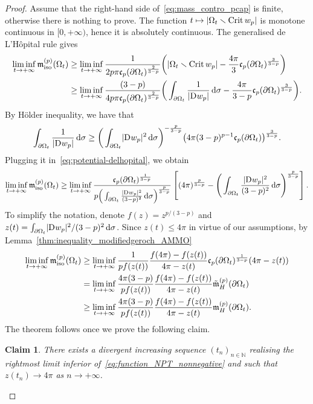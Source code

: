 \documentclass[11pt]{article}
\numberwithin{equation}{section}
\newcommand{\N}{\mathbb{N}}
\newcommand{\dif}{\,\mathrm{d}}
\newcommand{\D}{\mathrm{D}\kern.01cm}
\newcommand{\ncapa}{\mathfrak{c}}
\DeclareMathOperator{\iso}{iso}
\DeclareMathOperator{\Crit}{Crit}
\DeclarePairedDelimiter{\sigmaAbs}{\lvert}{\rvert}
\newcommand{\abs}[1]{\ifstrempty{#1}{\sigmaAbs{\kern1pt\cdot\kern1pt}}{\mathchoice{\sigmaAbs*{#1}}{\sigmaAbs{#1}}{\sigmaAbs{#1}}{\sigmaAbs{#1}}}}
\numberwithin{equation}{section}
\newtheorem{Claim}[Theorem]{Claim}
\renewcommand{\ncapa}{\mathfrak{c}}
\newcommand{\ma}{\mathfrak{m}}
\newcommand{\tp}[1][p]{{\text{\tiny$(#1)$}}}
\begin{document}
\begin{proof} Assume that the right-hand side of~\eqref{eq:mass_contro_pcap} is finite, otherwise there is nothing to prove. The function $t\mapsto \abs{\Omega_t\smallsetminus \Crit w_p}$ is monotone continuous in $[0, +\infty)$, hence it is absolutely continuous. The generalised de L'H\^opital rule gives
\begin{align}
 \liminf_{t \to +\infty} \ma_{\iso}^{\tp}(\Omega_t)&{}\geq\liminf_{t \to +\infty} \frac{1}{2p\pi \ncapa_p(\partial \Omega_t)^{\frac{2}{3-p}}}\bigg( \abs{\Omega_t\smallsetminus \Crit w_p } -\frac{4 \pi}{3} \ncapa_p (\partial \Omega_t)^\frac{3}{3-p}\bigg)\nonumber\\
 &{}\geq \liminf_{t \to +\infty} \frac{(3-p)}{4 p\pi \ncapa_p(\partial \Omega_t)^{\frac{2}{3-p}}}\bigg(\int_{\partial \Omega_t} \frac{1}{\abs{\D w_p}} \dif \sigma-\frac{4 \pi}{3-p} \ncapa_p (\partial \Omega_t)^\frac{3}{3-p}\bigg).\label{eq:potential-delhopital}
\end{align}
By H\"{o}lder inequality, we have that
\[
 \int_{\partial \Omega_t }\frac{1}{\abs{\D w_p}} \dif \sigma \geq \bigg(\int_{\partial \Omega_t}\abs{\D w_p}^2 \dif \sigma\bigg)^{-\frac{p}{3-p}}\big( 4 \pi (3-p)^{p-1}\ncapa_p(\partial \Omega_t)\big)^{\frac{3}{3-p}}.
\]
Plugging it in~\eqref{eq:potential-delhopital}, we obtain
\[
 \liminf_{t \to +\infty} \ma_{\iso}^{\tp}(\Omega_t)\geq\liminf_{t \to +\infty} \frac{\ncapa_p(\partial \Omega_t)^{\frac{1}{3-p}}}{p\Big(\int_{\partial \Omega_t} \frac{\abs{ \D w_p}^2}{(3-p)^2} \dif \sigma\Big)^{\frac{p}{3-p}} }\left[ ( 4\pi)^{\frac{p}{3-p}}-\Bigg(\int_{\partial \Omega_t}\frac{\abs{ \D w_p}^2}{(3-p)^2} \dif \sigma \Bigg)^{\frac{p}{3-p}}\right].
\]
To simplify the notation, denote $f(z)=z^{p/(3-p)}$ and $z(t)=\int_{\partial \Omega_t} \abs{\D w_p}^2 /(3-p)^2 \dif \sigma$. Since $z(t)\leq 4 \pi$ in virtue of our assumptions, by Lemma~\ref{thm:inequality_modifiedgeroch_AMMO}
\begin{align}
 \liminf_{t \to +\infty} \ma_{\iso}^{\tp}(\Omega_t)&{}\geq \liminf_{t \to +\infty}\frac{1}{p f(z(t))} \frac{f(4 \pi )-f(z(t))}{4\pi-z(t)} \ncapa_p(\partial \Omega_t)^{\frac{1}{3-p}}( 4 \pi -z(t)) \nonumber\\
 &{}=\liminf_{t \to +\infty}\frac{4\pi(3-p)}{p f(z(t))} \frac{f(4 \pi )-f(z(t))}{4\pi-z(t)} \tilde{\ma}_{H}^{\tp}(\partial \Omega_t) \nonumber\\
 &{}\geq \liminf_{t \to +\infty}\frac{4\pi(3-p)}{p f(z(t))} \frac{f(4 \pi )-f(z(t))}{4\pi-z(t)} \ma_{H}^{\tp}(\partial \Omega_t).\label{eq:function_NPT_nonnegative}
\end{align}
The theorem follows once we prove the following claim.
\begin{Claim}
There exists a divergent increasing sequence $(t_n)_{n \in \N}$ realising the rightmost limit inferior of~\eqref{eq:function_NPT_nonnegative} and such that $z(t_n)\to 4 \pi$ as $n\to +\infty$.
\end{Claim}


\end{proof}
\end{document}
